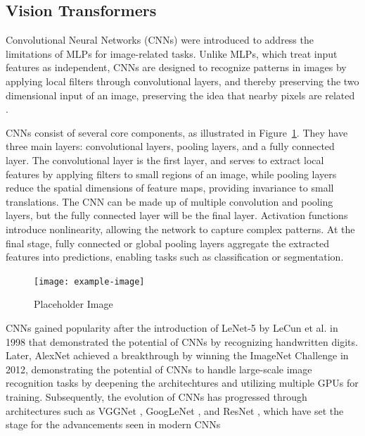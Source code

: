 
\subsection{Vision Transformers}
\label{sec:ViTs}

Convolutional Neural Networks (CNNs) \cite{lecun1995} were introduced to address the limitations of MLPs for image-related tasks. Unlike MLPs, which treat input features as independent, CNNs are designed to recognize patterns in images by applying local filters through convolutional layers, and thereby preserving the two dimensional input of an image, preserving the idea that nearby pixels are related \cite{lecun1998,NIPS2012_c399862d,zhang2023dive}. 

CNNs consist of several core components, as illustrated in Figure~\ref{fig:placeholder3}. They have three main layers: convolutional layers, pooling layers, and a fully connected layer. The convolutional layer is the first layer, and serves to extract local features by applying filters to small regions of an image, while pooling layers reduce the spatial dimensions of feature maps, providing invariance to small translations. The CNN can be made up of multiple convolution and pooling layers, but the fully connected layer will be the final layer. Activation functions introduce nonlinearity, allowing the network to capture complex patterns. At the final stage, fully connected or global pooling layers aggregate the extracted features into predictions, enabling tasks such as classification or segmentation.


\begin{figure}[ht]
    \centering
    \texttt{[image: example-image]} 
    \caption{Placeholder Image }
    \label{fig:placeholder3}
\end{figure}


CNNs gained popularity after the introduction of LeNet-5 by LeCun et al. in 1998 \cite{lecun1998} that demonstrated the potential of CNNs by recognizing handwritten digits. Later, AlexNet \cite{NIPS2012_c399862d} achieved a breakthrough by winning the ImageNet Challenge in 2012, demonstrating the potential of CNNs to handle large-scale image recognition tasks by deepening the architechtures and utilizing multiple GPUs for training. Subsequently, the evolution of CNNs has progressed through architectures such as VGGNet \cite{simonyan2015deepconvolutionalnetworkslargescale}, GoogLeNet \cite{szegedy2014goingdeeperconvolutions}, and ResNet \cite{he2016}, which have set the stage for the advancements seen in modern CNNs

